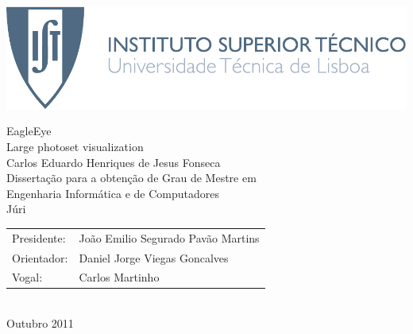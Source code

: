 
\thispagestyle {empty}

\includegraphics[bb=1.86cm 0cm 10cm 3.16cm,scale=0.56]{Logo}

\begin{center}
%
\vspace{6cm}

\vspace{0.8cm}
{\FontLb EagleEye} \\
\vspace{0.2cm}
{\FontMn Large photoset visualization } \\
\vspace{1.9cm}
{\FontMb Carlos Eduardo Henriques de Jesus Fonseca} \\
\vspace{1.9cm}
{\FontLn Disserta\c{c}\~{a}o para a obten\c{c}\~{a}o de Grau de Mestre em} \\
\vspace{0.3cm}
{\FontLb Engenharia Informática e de Computadores} \\
\vspace{1.9cm}
{\FontMb J\'{u}ri} \\
\vspace{0.3cm}
{\FontSn %
\begin{tabular}{ll}
Presidente: & João Emilio Segurado Pavão Martins \\
Orientador: & Daniel Jorge Viegas Goncalves \\
Vogal: & Carlos Martinho \\
\end{tabular} } \\
\vspace{1.1cm}
Outubro 2011 \\
%
\end{center}

\cleardoublepage


